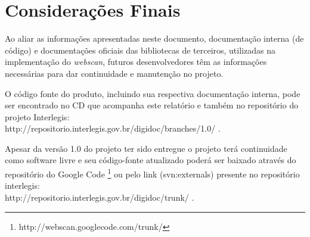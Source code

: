 \section{Considerações Finais}
\label{sec:consideracoes}

Ao aliar as informações apresentadas neste documento, documentação interna 
(de código) e documentações oficiais das bibliotecas de terceiros,
utilizadas na implementação do {\it webscan}, futuros desenvolvedores
têm as informações necessárias para dar continuidade e manutenção no projeto.

O código fonte do produto, incluindo sua respectiva documentação interna, 
pode ser encontrado no CD que acompanha este relatório e
também no repositório do projeto Interlegis: \\
http://repositorio.interlegis.gov.br/digidoc/branches/1.0/ .

Apesar da versão 1.0 do projeto ter sido entregue o projeto terá continuidade
como software livre e seu código-fonte atualizado poderá ser baixado através do
repositório do Google Code \footnote{http://webscan.googlecode.com/trunk/}
ou pelo link (svn:externals) presente no repositório interlegis: \\
http://repositorio.interlegis.gov.br/digidoc/trunk/ .

